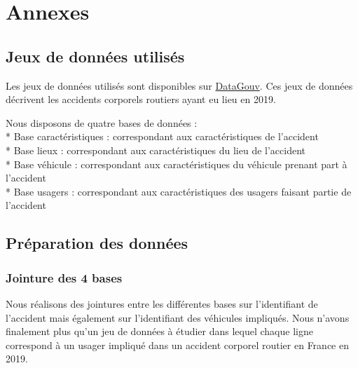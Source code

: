 \documentclass[french,]{tp}
\begin{document}
\newpage

\hypertarget{appendix-annexes}{%
\appendix}


\hypertarget{annexes}{%
\section{Annexes}\label{annexes}}

\hypertarget{jeux-de-donnuxe9es-utilisuxe9s}{%
\subsection{Jeux de données utilisés}\label{jeux-de-donnuxe9es-utilisuxe9s}}

Les jeux de données utilisés sont disponibles sur \href{https://www.data.gouv.fr/fr/datasets/bases-de-donnees-annuelles-des-accidents-corporels-de-la-circulation-routiere-annees-de-2005-a-2019/}{DataGouv}. Ces jeux de données décrivent les accidents corporels routiers ayant eu lieu en 2019.

Nous disposons de quatre bases de données :\\
* Base caractéristiques : correspondant aux caractéristiques de l'accident\\
* Base lieux : correspondant aux caractéristiques du lieu de l'accident\\
* Base véhicule : correspondant aux caractéristiques du véhicule prenant part à l'accident\\
* Base usagers : correspondant aux caractéristiques des usagers faisant partie de l'accident

\hypertarget{pruxe9paration-des-donnuxe9es}{%
\subsection{Préparation des données}\label{pruxe9paration-des-donnuxe9es}}

\hypertarget{jointure-des-4-bases}{%
\subsubsection{Jointure des 4 bases}\label{jointure-des-4-bases}}

Nous réalisons des jointures entre les différentes bases sur l'identifiant de l'accident mais également sur l'identifiant des véhicules impliqués. Nous n'avons finalement plus qu'un jeu de données à étudier dans lequel chaque ligne correspond à un usager impliqué dans un accident corporel routier en France en 2019.
\end{document}
